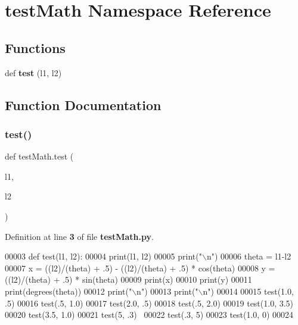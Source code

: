 \section{test\+Math Namespace Reference}
\label{namespacetest_math}
\subsection*{Functions}
\begin{DoxyCompactItemize}
\item 
def \textbf{ test} (l1, l2)
\end{DoxyCompactItemize}


\subsection{Function Documentation}
\mbox{\label{namespacetest_math_aa1a3d4e1c4f74f13640e69f5e9e1ce39}} 
\subsubsection{test()}
{\footnotesize\ttfamily def test\+Math.\+test (\begin{DoxyParamCaption}\item[{}]{l1,  }\item[{}]{l2 }\end{DoxyParamCaption})}



Definition at line \textbf{ 3} of file \textbf{ test\+Math.\+py}.


\begin{DoxyCode}
00003 \textcolor{keyword}{def }test(l1, l2):
00004     print(l1, l2)
00005     print(\textcolor{stringliteral}{"\(\backslash\)n"})
00006     theta = l1-l2
00007     x = ((l2)/(theta) + .5) - ((l2)/(theta) + .5) * cos(theta)
00008     y = ((l2)/(theta) + .5) * sin(theta)
00009     print(x)
00010     print(y)
00011     print(degrees(theta))
00012     print(\textcolor{stringliteral}{"\(\backslash\)n"})
00013     print(\textcolor{stringliteral}{"\(\backslash\)n"})
00014 
00015 test(1.0, .5)
00016 test(.5, 1.0)
00017 test(2.0, .5)
00018 test(.5, 2.0)
00019 test(1.0, 3.5)
00020 test(3.5, 1.0)
00021 test(5, .3) 
00022 test(.3, 5)
00023 test(1.0, 0)
00024 \end{DoxyCode}
